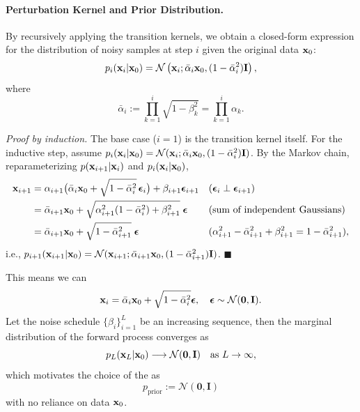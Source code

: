 \paragraph{Perturbation Kernel and Prior Distribution.}
By recursively applying the transition kernels, we obtain a closed-form expression for the distribution of noisy samples at step $i$ given the original data ${\mathbf{x}}_0$:
\[
p_i({\mathbf{x}}_i|{\mathbf{x}}_0) = \mathcal{N}\left({\mathbf{x}}_i; \bar{\alpha}_i {\mathbf{x}}_0, (1 - \bar{\alpha}_i^2) {\mathbf{I}} \right),
\]
where 
\[
\bar{\alpha}_i := \prod_{k=1}^i \sqrt{1-\beta_k^2} = \prod_{k=1}^i \alpha_k.
\]
\begin{nknote}
\noindent\textit{Proof by induction.} The base case ($i=1$) is the transition kernel itself. For the inductive step, assume $p_i({\mathbf{x}}_i|{\mathbf{x}}_0) = \mathcal{N}({\mathbf{x}}_i; \bar{\alpha}_i{\mathbf{x}}_0, (1-\bar{\alpha}_i^2){\mathbf{I}})$. By the Markov chain, reparameterizing $p({\mathbf{x}}_{i+1}|{\mathbf{x}}_i)$ and $p_i({\mathbf{x}}_i|{\mathbf{x}}_0)$,
\begin{align*}
{\mathbf{x}}_{i+1}
&= \alpha_{i+1}\big(\bar{\alpha}_i{\mathbf{x}}_0 + \sqrt{1-\bar{\alpha}_i^2}\,\bm{\epsilon}_i\big) + \beta_{i+1}\bm{\epsilon}_{i+1}
&&(\bm{\epsilon}_i \perp \bm{\epsilon}_{i+1}) \\
&= \bar{\alpha}_{i+1}{\mathbf{x}}_0 + \sqrt{\alpha_{i+1}^2(1-\bar{\alpha}_i^2) + \beta_{i+1}^2}\;\bm{\epsilon}
&&\text{(sum of independent Gaussians)} \\
&= \bar{\alpha}_{i+1}{\mathbf{x}}_0 + \sqrt{1-\bar{\alpha}_{i+1}^2}\;\bm{\epsilon}
&&(\alpha_{i+1}^2 - \bar{\alpha}_{i+1}^2 + \beta_{i+1}^2 = 1 - \bar{\alpha}_{i+1}^2),
\end{align*}
i.e., $p_{i+1}({\mathbf{x}}_{i+1}|{\mathbf{x}}_0) = \mathcal{N}({\mathbf{x}}_{i+1}; \bar{\alpha}_{i+1}{\mathbf{x}}_0, (1-\bar{\alpha}_{i+1}^2){\mathbf{I}})$. \hfill$\blacksquare$
\end{nknote}
This means we can 
\begin{align}\label{eq:ddpm-forward}
    {\mathbf{x}}_i = \bar{\alpha}_i {\mathbf{x}}_0 + \sqrt{1-\bar{\alpha}_i^2}   \bm{\epsilon}, \quad \bm{\epsilon} \sim \mathcal{N}(\bm{0}, {\mathbf{I}}).
\end{align}
Let the noise schedule $ \{\beta_i\}_{i=1}^L $ be an increasing sequence, then the marginal distribution of the forward process converges as
\[
p_L(\mathbf{x}_L | {\mathbf{x}}_0) \longrightarrow \mathcal{N}(\mathbf{0}, \mathbf{I}) \quad \text{as } L \to \infty,
\]
which motivates the choice of the  as
\[
p_{\text{prior}} := \mathcal{N}(\mathbf{0}, \mathbf{I})
\]
with no reliance on data ${\mathbf{x}}_0$.




